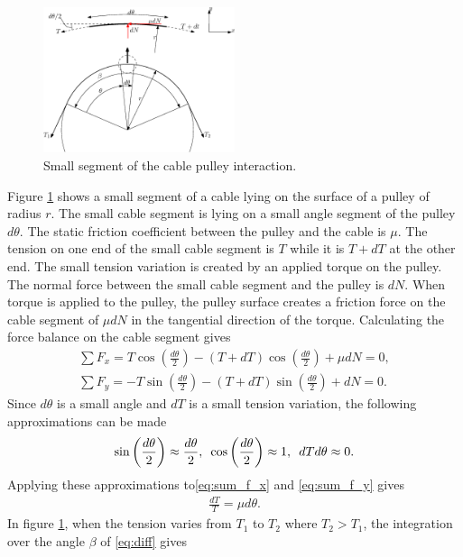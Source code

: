 \documentclass[10pt,cleanfoot]{asme2ej}
\newcommand{\hquad}{\hspace{0.5em}}
\begin{document}
\begin{figure}
    \centering
    \includegraphics[width = 0.5\textwidth]{capstan_equation.eps}
    \caption{Small segment of the cable pulley interaction.}
    \label{fig:friction_fig}
\end{figure}
\par
Figure \ref{fig:friction_fig} shows a small  segment of a cable lying on the surface of a pulley of radius $r$. The small cable segment is lying on a small angle segment of the pulley $d\theta$. The static friction coefficient between the pulley and the cable is $\mu$. The tension on one end of the small cable segment is $T$ while it is $T+dT$ at the other end. The small tension variation is created by an applied torque on the pulley. The normal force between the small cable segment and the pulley  is $dN$. When torque is applied to the pulley, the pulley surface creates a friction force on the cable segment of $\mu dN$ in the tangential direction of the torque. Calculating the force balance on the cable segment gives 
\begin{align}
    \sum F_x = T\cos\left(\frac{d\theta}{2}\right) - (T+dT)\cos\left(\frac{d\theta}{2}\right) + \mu dN =0,\label{eq:sum_f_x}\\
    \sum F_y = -T\sin\left(\frac{d\theta}{2}\right)-(T+dT)\sin\left(\frac{d\theta}{2}\right)+dN = 0.\label{eq:sum_f_y}
\end{align}
Since $d\theta$ is a small angle and $dT$ is a small tension variation, the following approximations can be made
\begin{align}
    \sin\left(\frac{d\theta}{2}\right)\approx \frac{d\theta}{2},\hquad \cos\left(\frac{d\theta}{2}\right)\approx 1,\hquad dTd\theta \approx 0. 
\end{align}
Applying these approximations to\eqref{eq:sum_f_x} and \eqref{eq:sum_f_y} gives
\begin{align}
    \frac{dT}{T} = \mu d\theta. \label{eq:diff}
\end{align}
In figure \ref{fig:friction_fig}, when the tension varies from $T_1$ to $T_2$ where $T_2>T_1$, the integration over the angle $\beta$ of \eqref{eq:diff} gives
\end{document}
